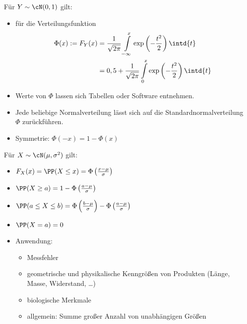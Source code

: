  Für $Y \sim \cN (0,1)$ gilt:
\begin{itemize}
\item für die Verteilungsfunktion
\begin{align*}
\Phi(x):=F_Y(x)&=\frac{1}{\sqrt{2\pi}}\int\limits_{-\infty}^x \exp\left(-\frac{t^2}{2}\right)\intd{t}\\
&= 0,5 + \frac{1}{\sqrt{2\pi}}\int\limits_0^x \exp\left(-\frac{t^2}{2}\right)\intd{t}
\end{align*}
\item Werte von $\Phi$ lassen sich Tabellen oder Software entnehmen.
\item Jede beliebige Normalverteilung lässt sich auf die Standardnormalverteilung $\Phi$ zurückführen.
\item Symmetrie: $\Phi(-x)=1-\Phi(x)$
\end{itemize}

 Für $X \sim \cN(\mu, \sigma^2)$ gilt:
\begin{itemize}
\item $F_X(x) = \PP(X\leq x) = \Phi \left(\frac{x-\mu}{\sigma}\right)$
\item $\PP(X\geq a) = 1 - \Phi \left(\frac{a-\mu}{\sigma}\right)$
\item $\PP(a\leq X\leq b)=\Phi \left(\frac{b-\mu}{\sigma}\right)-\Phi \left(\frac{a-\mu}{\sigma}\right)$
\item $\PP(X=a)=0$
\item Anwendung:
\begin{itemize}
\item Messfehler
\item geometrische und physikalische  Kenngrößen von Produkten (Länge, Masse, Widerstand, …)
\item biologische Merkmale
\item allgemein: Summe großer Anzahl von unabhängigen Größen
\end{itemize}
\end{itemize}

